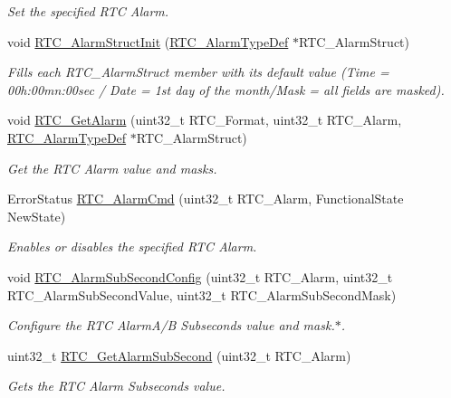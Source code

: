 \begin{DoxyCompactItemize}
\begin{DoxyCompactList}\small\item\em Set the specified R\-T\-C Alarm. \end{DoxyCompactList}\item 
void \hyperlink{group___r_t_c_ga36ab6199e21fb415ab1ec4d7aa48ba45}{R\-T\-C\-\_\-\-Alarm\-Struct\-Init} (\hyperlink{struct_r_t_c___alarm_type_def}{R\-T\-C\-\_\-\-Alarm\-Type\-Def} $\ast$R\-T\-C\-\_\-\-Alarm\-Struct)
\begin{DoxyCompactList}\small\item\em Fills each R\-T\-C\-\_\-\-Alarm\-Struct member with its default value (Time = 00h\-:00mn\-:00sec / Date = 1st day of the month/\-Mask = all fields are masked). \end{DoxyCompactList}\item 
void \hyperlink{group___r_t_c_ga6e2888d2fd2e3ecb4ec50f5c955b362b}{R\-T\-C\-\_\-\-Get\-Alarm} (uint32\-\_\-t R\-T\-C\-\_\-\-Format, uint32\-\_\-t R\-T\-C\-\_\-\-Alarm, \hyperlink{struct_r_t_c___alarm_type_def}{R\-T\-C\-\_\-\-Alarm\-Type\-Def} $\ast$R\-T\-C\-\_\-\-Alarm\-Struct)
\begin{DoxyCompactList}\small\item\em Get the R\-T\-C Alarm value and masks. \end{DoxyCompactList}\item 
Error\-Status \hyperlink{group___r_t_c_gac2c08f1aeeb664d3d245cb5aca1b8ca8}{R\-T\-C\-\_\-\-Alarm\-Cmd} (uint32\-\_\-t R\-T\-C\-\_\-\-Alarm, Functional\-State New\-State)
\begin{DoxyCompactList}\small\item\em Enables or disables the specified R\-T\-C Alarm. \end{DoxyCompactList}\item 
void \hyperlink{group___r_t_c_ga7b3e4e9e39262e9b0d1aadd895394e46}{R\-T\-C\-\_\-\-Alarm\-Sub\-Second\-Config} (uint32\-\_\-t R\-T\-C\-\_\-\-Alarm, uint32\-\_\-t R\-T\-C\-\_\-\-Alarm\-Sub\-Second\-Value, uint32\-\_\-t R\-T\-C\-\_\-\-Alarm\-Sub\-Second\-Mask)
\begin{DoxyCompactList}\small\item\em Configure the R\-T\-C Alarm\-A/\-B Subseconds value and mask.$\ast$. \end{DoxyCompactList}\item 
uint32\-\_\-t \hyperlink{group___r_t_c_gae7b5e7146be2710d619c8ed3cca464ad}{R\-T\-C\-\_\-\-Get\-Alarm\-Sub\-Second} (uint32\-\_\-t R\-T\-C\-\_\-\-Alarm)
\begin{DoxyCompactList}\small\item\em Gets the R\-T\-C Alarm Subseconds value. \end{DoxyCompactList}\item 

\end{DoxyCompactItemize}
